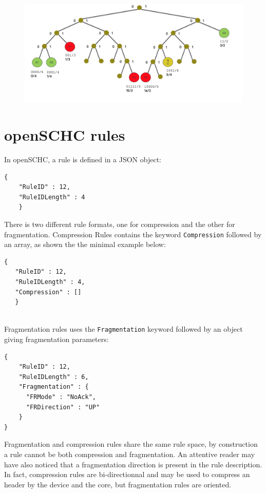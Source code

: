 \begin{figure}[tbp]
\centerline{\includegraphics[width=1\columnwidth]{Pictures/binary-rule.png}}
\label{fig-base64}
\end{figure}

\section{openSCHC rules}

In openSCHC, a rule is defined in a JSON object:

\begin{lstlisting}[backgroundcolor=\color{yellow}]
    {
    "RuleID" : 12,
    "RuleIDLength" : 4
    }
\end{lstlisting}

There is two different rule formats, one for compression and the other for fragmentation. Compression Rules contains the keyword \texttt{Compression} followed by an array, as shown the the minimal example below: 

\begin{lstlisting}[backgroundcolor=\color{yellow}]
   {
   "RuleID" : 12,
   "RuleIDLength" : 4,
   "Compression" : []
   }
   
\end{lstlisting}

   
Fragmentation rules uses the \texttt{Fragmentation} keyword followed by an object giving fragmentation parameters:

\begin{lstlisting}[backgroundcolor=\color{yellow}]
    {
    "RuleID" : 12,
    "RuleIDLength" : 6,
    "Fragmentation" : {
      "FRMode" : "NoAck",
      "FRDirection" : "UP"
    }
}
\end{lstlisting}

Fragmentation and compression rules share the same rule space, by construction a rule cannot be both compression and fragmentation. 
An attentive reader may have also noticed that a fragmentation direction is present in the rule description. 
In fact, compression rules are bi-directionnal and may be used to compress an header by the device and the core, but fragmentation rules are oriented.  

